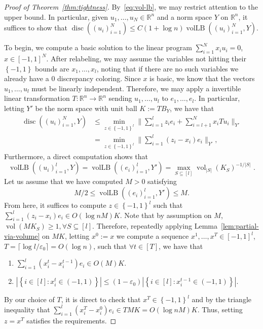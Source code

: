 \documentclass[12pt]{article}
\newcommand{\R}{{\mathbb{R}}}
\newcommand\eps{\varepsilon}
\newcommand{\set}[1]{\left\{ #1 \right\}}
\DeclareMathOperator{\vollb}{volLB}
\DeclareMathOperator{\disc}{disc}
\DeclareMathOperator{\vol}{vol}
\begin{document}
\begin{proof}[Proof of Theorem~\ref{thm:tightness}]
By~\eqref{eq:vol-lb}, we may restrict attention to the upper bound. In particular,
given $u_1,\dots,u_N \in \R^n$ and a norm space $Y$ on $\R^n$, it suffices to
show that $\disc((u_i)_{i=1}^N) \leq C(1+\log n)\vollb((u_i)_{i=1}^N,Y)$.  

To begin, we compute a basic solution to the linear program $\sum_{i=1}^N x_i
u_i = 0$, $x \in [-1,1]^N$. After relabeling, we may assume the variables not
hitting their $\set{-1,1}$ bounds are $x_1,\dots,x_l$, noting that if there are
no such variables we already have a $0$ discrepancy coloring. Since
$x$ is basic, we know that the vectors $u_1,\dots,u_l$ must be linearly
independent. Therefore, we may apply a invertible linear
transformation $T:\R^n \rightarrow \R^n$ sending $u_1,\dots,u_l$ to
$e_1,\dots,e_l$. In particular, letting $Y'$ be the norm space with unit ball $K
:= TB_Y$, we have that 
\begin{align*}
\disc((u_i)_{i=1}^N,Y) &\leq \min_{z \in \set{-1,1}^l} \|\sum_{i=1}^l z_i e_i +
\sum_{i=l+1}^N x_i T u_i\|_{Y'} \\
                &= \min_{z \in \set{-1,1}^l} \|\sum_{i=1}^l (z_i-x_i)e_i\|_{Y'}, 
\end{align*}
Furthermore, a direct computation shows that
\[
\vollb((u_i)_{i=1}^l,Y) = \vollb((e_i)_{i=1}^l,Y') = \max_{S \subseteq [l]}
\vol_{|S|}(K_S)^{-1/|S|} \text{ .}
\] 
Let us assume that we have computed $M > 0$ satisfying 
\[
M/2 \leq \vollb((e_i)_{i=1}^l,Y') \leq M. 
\]
From here, it suffices to compute $z \in
\set{-1,1}^l$ such that $\sum_{i=1}^l (z_i-x_i) e_i \in O(\log n M) K$. Note
that by assumption on $M$, $\vol(MK_S) \geq 1, \forall S \subseteq [l]$.
Therefore, repeatedly applying Lemma~\ref{lem:partial-via-volume} on $MK$, letting $x^0 := x$ we compute a sequence
$x^1,\dots,x^T \in [-1,1]^l$, $T = \lceil \log l/\eps_0
\rceil = O(\log n)$, such that $\forall t \in [T]$, we have that

\begin{enumerate}
\item $\sum_{i=1}^l (x^t_i-x^{t-1}_i)e_i \in O(M) K$.
\item $|\set{i \in [l]: x^t_i \in (-1,1)}| \leq (1-\eps_0)|\set{i \in [l]:
x^{t-1}_i \in (-1,1)}|$.
\end{enumerate}

By our choice of $T$, it is direct to check that $x^T \in \set{-1,1}^l$ and by
the triangle inequality that $\sum_{i=1}^l (x^T_i-x^0_i)e_i \in T M K = O(\log n
M) K$. Thus, setting $z = x^T$ satisfies the requirements.


\end{proof}
\end{document}
